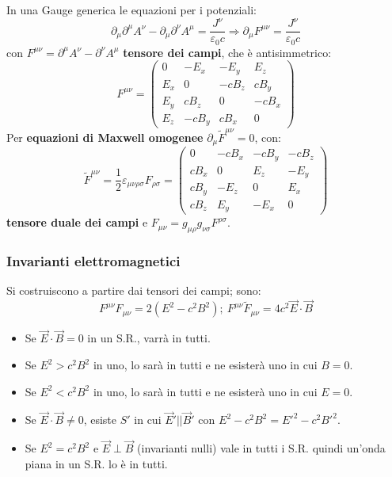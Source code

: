 \documentclass[10pt, a4paper]{scrartcl}
\numberwithin{equation}{subsection}
\theoremstyle{style1}
\begin{document}
In una Gauge generica le equazioni per i potenziali:
\begin{equation}
	\partial _\mu \partial ^\mu A^\nu - \partial _\mu \partial ^\nu A^\mu = \frac{J^\nu}{\varepsilon _0 c}\Rightarrow \partial _\mu  F^{\mu \nu} = \frac{J^\nu}{\varepsilon _0 c}  
\end{equation}
con $F^{\mu \nu} = \partial^\mu A^\nu - \partial ^\nu A^\mu$ \textbf{tensore dei campi}, che \`e antisimmetrico:
\begin{equation}
	F^{\mu \nu} =\begin{pmatrix} 0 &-E_x & - E_y &E_z\\ E_x & 0 & -cB_z & cB_y \\ E_y& cB_z & 0 & - cB_x \\ E_z & - cB_y & cB_x & 0 \end{pmatrix} 
\end{equation}
Per \textbf{equazioni di Maxwell omogenee} $\partial _\mu \widetilde{F}^{\mu \nu} = 0 $, con:
\begin{equation}
	\widetilde{F}^{\mu \nu}=\frac{1}{2}\varepsilon _{\mu \nu\rho \sigma  } F_{\rho \sigma  } =\begin{pmatrix} 0&-cB_x & -cB_y& -cB_z\\cB_x & 0  & E_z & -E_y\\cB_y & - E_z & 0 & E_x \\ cB_z & E_y & - E_x & 0 \end{pmatrix}  	
\end{equation}
\textbf{tensore duale dei campi} e $F_{\mu \nu} = g_{\mu \rho   } g_{\nu  \sigma } F^{\rho \sigma } $.
\subsubsection{Invarianti elettromagnetici}
Si costruiscono a partire dai tensori dei campi; sono:
\begin{equation}
	F^{\mu  \nu} F_{\mu \nu} = 2(E^2- c^2 B^2); \ F^{\mu \nu} \widetilde{F}_{\mu \nu} = 4c^2 \vec{E}\cdot \vec{B} 
\end{equation}
\begin{itemize}
	\item Se $\vec{E}\cdot \vec{B}= 0 $ in un S.R., varr\`a in tutti.
	\item Se $E^2>c^2B^2$ in uno, lo sar\`a in tutti e ne esister\`a uno in cui $B=0$.
	\item Se $E^2 < c^2 B^2$ in uno, lo sar\`a in tutti e ne esister\`a uno in cui $E=0$.
	\item Se $\vec{E}\cdot \vec{B}\neq 0$, esiste $S'$ in cui $\vec{E}'  | |  \vec{B}'$ con $E^2 - c^2 B^2 = E'^2 - c^2 B'^2$.
	\item Se $E^2 = c^2 B^2$ e $\vec{E}\perp \vec{B}$ (invarianti nulli) vale in tutti i S.R. quindi un'onda piana in un S.R. lo \`e in tutti.
\end{itemize}
\end{document}
